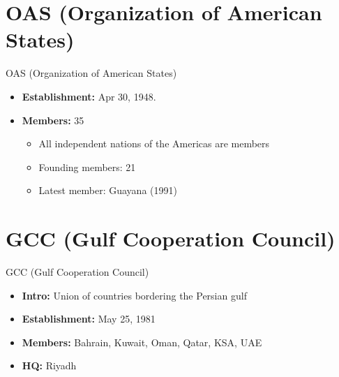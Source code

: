 \documentclass[
  10pt,
  ignorenonframetext,
  progressbar=frametitle]{beamer}
\providecommand{\tightlist}{%
  \setlength{\itemsep}{0pt}\setlength{\parskip}{0pt}}
\begin{document}
\section{OAS (Organization of American States)}
\begin{frame}[allowframebreaks]
{OAS (Organization of American States)}
\protect\hypertarget{oas-organization-of-american-states}{}
\begin{itemize}
\tightlist
\item
  \textbf{Establishment:} Apr 30, 1948.
\item
  \textbf{Members:} 35

  \begin{itemize}
  \tightlist
  \item
    All independent nations of the Americas are members
  \item
    Founding members: 21
  \item
    Latest member: Guayana (1991)
  \end{itemize}
\end{itemize}
\end{frame}

\section{GCC (Gulf Cooperation Council)}
\begin{frame}[allowframebreaks]
{GCC (Gulf Cooperation Council)}
\protect\hypertarget{gcc-gulf-cooperation-council}{}
\begin{itemize}
\tightlist
\item
  \textbf{Intro:} Union of countries bordering the Persian gulf
\item
  \textbf{Establishment:} May 25, 1981
\item
  \textbf{Members:} Bahrain, Kuwait, Oman, Qatar, KSA, UAE
\item
  \textbf{HQ:} Riyadh
\end{itemize}
\end{frame}
\end{document}
